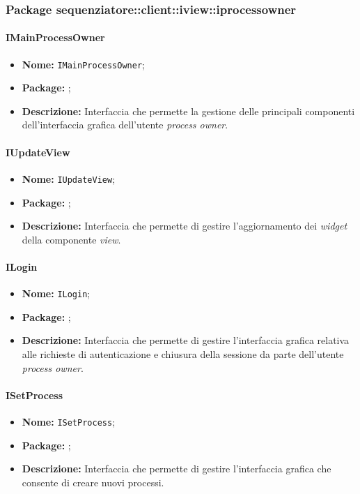 \subsubsection{Package sequenziatore::client::iview::iprocessowner}

\paragraph{IMainProcessOwner}
\begin{itemize}
\item \textbf{Nome:} \texttt{IMainProcessOwner};
\item \textbf{Package:} \texttt{\iViewAdmin{}};
\item \textbf{Descrizione:} Interfaccia che permette la gestione delle principali componenti dell'interfaccia grafica dell'utente \textit{process owner}.
\end{itemize}

\paragraph{IUpdateView}
\begin{itemize}
\item \textbf{Nome:} \texttt{IUpdateView};
\item \textbf{Package:} \texttt{\iViewAdmin{}};
\item \textbf{Descrizione:} Interfaccia che permette di gestire l'aggiornamento dei \textit{widget} della componente \textit{view}.
\end{itemize}

\paragraph{ILogin}
\begin{itemize}
\item \textbf{Nome:} \texttt{ILogin};
\item \textbf{Package:} \texttt{\iViewAdmin{}};
\item \textbf{Descrizione:} Interfaccia che permette di gestire l'interfaccia grafica relativa alle richieste di autenticazione e chiusura della sessione da parte dell'utente \textit{process owner}.
\end{itemize}

\paragraph{ISetProcess}
\begin{itemize}
\item \textbf{Nome:} \texttt{ISetProcess};
\item \textbf{Package:} \texttt{\iViewAdmin{}};
\item \textbf{Descrizione:} Interfaccia che permette di gestire l'interfaccia grafica che consente di creare nuovi processi.
\end{itemize}


